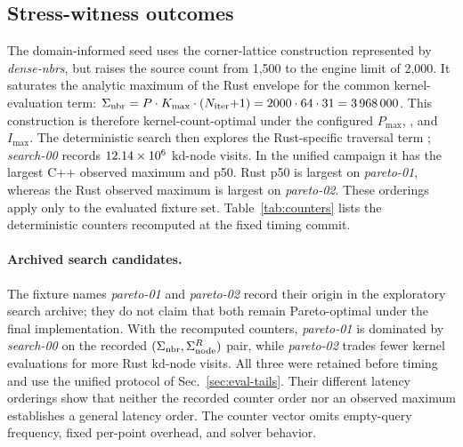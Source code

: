 \subsection{Stress-witness outcomes}
\label{sec:eval-search}
The domain-informed seed uses the corner-lattice construction represented by
\emph{dense-nbrs}, but raises the source count from 1,500 to the engine limit of 2,000.
It saturates the analytic maximum of the Rust envelope for the common kernel-evaluation
term: $\Sigma_{\mathrm{nbr}} = P \cdot K_{\max} \cdot (N_{\mathrm{iter}}{+}1)
= 2000 \cdot 64 \cdot 31 = \num{3968000}{}$. This construction is therefore
kernel-count-optimal under the configured $P_{\max}$, \maxnn, and $I_{\max}$.
The deterministic search then explores the Rust-specific traversal term \kdnodes{};
\emph{search-00} records $12.14\times10^6$ kd-node visits. In the unified
campaign it has the largest C++ observed maximum and p50. Rust p50 is largest on
\emph{pareto-01}, whereas the Rust observed maximum is largest on \emph{pareto-02}.
These orderings apply only to the evaluated fixture set. Table~\ref{tab:counters} lists
the deterministic counters recomputed at the fixed timing commit.



\paragraph{Archived search candidates.} The fixture names \emph{pareto-01} and
\emph{pareto-02} record their origin in the exploratory search archive; they do not claim
that both remain Pareto-optimal under the final implementation. With the recomputed
counters, \emph{pareto-01} is dominated by \emph{search-00} on the recorded
$(\Sigma_{\mathrm{nbr}},\Sigma_{\mathrm{node}}^{R})$ pair, while \emph{pareto-02} trades fewer kernel evaluations for
more Rust kd-node visits. All three were retained before timing and use the unified protocol
of Sec.~\ref{sec:eval-tails}. Their different latency orderings show that neither the
recorded counter order nor an observed maximum establishes a general latency order. The
counter vector omits empty-query frequency, fixed per-point overhead, and solver behavior.

